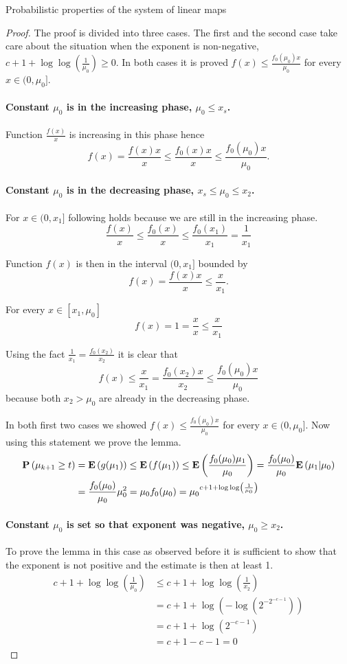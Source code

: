\begin{section}{Probabilistic properties of the system of linear maps}
\begin{proof}
The proof is divided into three cases. The first and the second case take care about the situation when the exponent is non-negative, $c + 1 + \log \log \left(\frac{1}{\mu_0}\right) \geq 0$. In both cases it is proved $f(x) \leq \frac{f_0(\mu_0)x}{\mu_0}$ for every $x \in (0, \mu_0]$.
\paragraph{Constant $\mu_0$ is in the increasing phase, $\mu_0 \leq x_s$.}
Function $\frac{f(x)}{x}$ is increasing in this phase hence
\[
f(x) = \frac{f(x)x}{x} \leq \frac{f_0(x)x}{x} \leq \frac{f_0(\mu_0)x}{\mu_0} \text{.}
\]

\paragraph{Constant $\mu_0$ is in the decreasing phase, $x_s \leq \mu_0 \leq x_2$.}
For $x \in (0, x_1]$ following holds because we are still in the increasing phase.
\[
\frac{f(x)}{x} \leq \frac{f_0(x)}{x} \leq \frac{f_0(x_1)}{x_1} = \frac{1}{x_1}
\]

Function $f(x)$ is then in the interval $(0, x_1]$ bounded by \[f(x) = \frac{f(x)x}{x} \leq \frac{x}{x_1} \text{.} \]

For every $x \in [x_1, \mu_0]$ 
\[ 
	f(x) = 1 = \frac{x}{x} \leq \frac{x}{x_1}
\]

Using the fact $\frac{1}{x_1} = \frac{f_0(x_2)}{x_2}$ it is clear that 
\[
	f(x) \leq \frac{x}{x_1} = \frac{f_0(x_2)x}{x_2} \leq \frac{f_0(\mu_0)x}{\mu_0}
\]
because both $x_2 > \mu_0$ are already in the decreasing phase.

In both first two cases we showed $f(x) \leq \frac{f_0(\mu_0)x}{\mu_0}$ for every $x \in (0, \mu_0]$. Now using this statement we prove the lemma.
\[
\begin{split}
\mathbf{P}\left(\mu_{k + 1} \geq t\right)
	& = \mathbf{E}\left(g(\mu_1)\right) \leq \mathbf{E}\left(f(\mu_1)\right) \leq \mathbf{E}\left(\frac{f_0(\mu_0)\mu_1}{\mu_0}\right) = \frac{f_0(\mu_0)}{\mu_0}\mathbf{E}\left(\mu_1|\mu_0\right) \\
	& = \frac{f_0(\mu_0)}{\mu_0}\mu_0 ^ 2 = \mu_0 f_0(\mu_0) = {\mu_0}^{c + 1 + \log \log \left(\frac{1}{\mu_0}\right)}
\end{split}
\]

\paragraph{Constant $\mu_0$ is set so that exponent was negative, $\mu_0 \geq x_2$.}
To prove the lemma in this case as observed before it is sufficient to show that the exponent is not positive and the estimate is then at least 1.
\[
\begin{split}
	c + 1 + \log \log \left( \frac{1}{\mu_0} \right) 
		& \leq c + 1 + \log \log \left( \frac{1}{x_2} \right) \\ 
		& = c + 1 + \log \left(- \log \left(2 ^ {-2 ^ {-c - 1}}\right)\right) \\ 
		& = c + 1 + \log \left(2 ^ {-c - 1}\right) \\ 
		& = c + 1 - c - 1 = 0
\end{split}
\]


\end{proof}
\end{section}
